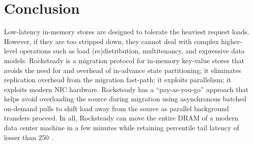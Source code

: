 \section{Conclusion}

Low-latency in-memory stores are designed to tolerate the heaviest request
loads. However, if they are too stripped down, they cannot deal with complex
higher-level operations such as load (re)distribution,
multitenancy, and expressive data models.
%
Rocksteady is a migration protocol for in-memory key-value stores that avoids
the need for and overhead of in-advance state partitioning; it eliminates
replication overhead from the migration fast-path; it exploits parallelism;
it exploits modern NIC hardware.  Rocksteady has a
``pay-as-you-go'' approach that helps avoid overloading the source during migration
using asynchronous batched on-demand pulls to shift load away from the source
as parallel background transfers proceed.  In all, Rocksteady can move the entire DRAM
of a modern data center machine in a few minutes while retaining \nnnth
percentile tail latency of lesser than 250~\us.
